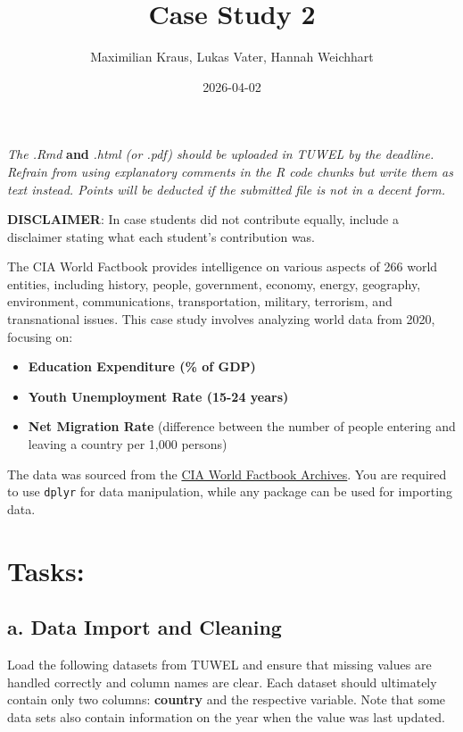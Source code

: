 \documentclass[
]{article}
\title{Case Study 2}
\author{Maximilian Kraus, Lukas Vater, Hannah Weichhart}
\date{2026-04-02}
\providecommand{\tightlist}{%
  \setlength{\itemsep}{0pt}\setlength{\parskip}{0pt}}
\begin{document}
\maketitle

\emph{The .Rmd} \textbf{and} \emph{.html (or .pdf) should be uploaded in
TUWEL by the deadline. Refrain from using explanatory comments in the R
code chunks but write them as text instead. Points will be deducted if
the submitted file is not in a decent form.}

\textbf{DISCLAIMER}: In case students did not contribute equally,
include a disclaimer stating what each student's contribution was.

The CIA World Factbook provides intelligence on various aspects of 266
world entities, including history, people, government, economy, energy,
geography, environment, communications, transportation, military,
terrorism, and transnational issues. This case study involves analyzing
world data from 2020, focusing on:

\begin{itemize}
\tightlist
\item
  \textbf{Education Expenditure (\% of GDP)}
\item
  \textbf{Youth Unemployment Rate (15-24 years)}
\item
  \textbf{Net Migration Rate} (difference between the number of people
  entering and leaving a country per 1,000 persons)
\end{itemize}

The data was sourced from the
\href{https://www.cia.gov/the-world-factbook/about/archives/}{CIA World
Factbook Archives}. You are required to use \texttt{dplyr} for data
manipulation, while any package can be used for importing data.

\section{Tasks:}\label{tasks}

\subsection{a. Data Import and
Cleaning}\label{a.-data-import-and-cleaning}

Load the following datasets from TUWEL and ensure that missing values
are handled correctly and column names are clear. Each dataset should
ultimately contain only two columns: \textbf{country} and the respective
variable. Note that some data sets also contain information on the year
when the value was last updated.
\end{document}
